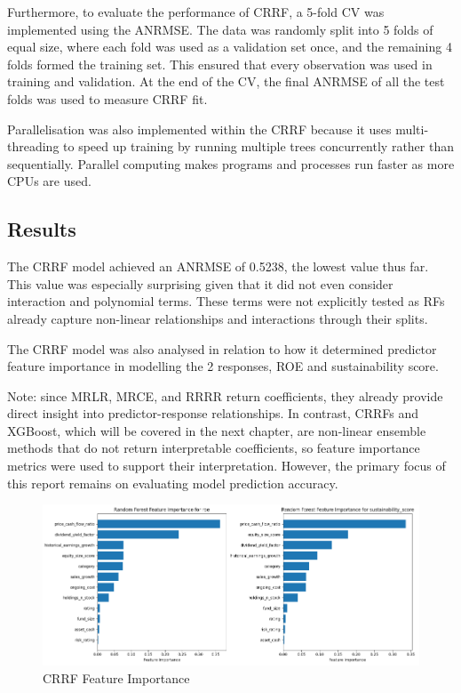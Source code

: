 \documentclass[11pt]{report} %
\begin{document}
Furthermore, to evaluate the performance of CRRF, a 5-fold CV was implemented using the ANRMSE. The data was randomly split into 5 folds of equal size, where each fold was used as a validation set once, and the remaining 4 folds formed the training set. This ensured that every observation was used in training and validation. At the end of the CV, the final ANRMSE of all the test folds was used to measure CRRF fit.

Parallelisation was also implemented within the CRRF because it uses multi-threading to speed up training by running multiple trees concurrently rather than sequentially. Parallel computing makes programs and processes run faster as more CPUs are used.\cite{azizah2019implementation}

\subsection{Results}
\label{C5 Results}
The CRRF model achieved an ANRMSE of 0.5238, the lowest value thus far. This value was especially surprising given that it did not even consider interaction and polynomial terms. These terms were not explicitly tested as RFs already capture non-linear relationships and interactions through their splits. 

The CRRF model was also analysed in relation to how it determined predictor feature importance in modelling the 2 responses, ROE and sustainability score.

\noindent Note: since MRLR, MRCE, and RRRR return coefficients, they already provide direct insight into predictor-response relationships. In contrast, CRRFs and XGBoost, which will be covered in the next chapter, are non-linear ensemble methods that do not return interpretable coefficients, so feature importance metrics were used to support their interpretation. However, the primary focus of this report remains on evaluating model prediction accuracy.

\begin{figure}[H]
    \centering
    \includegraphics[width=\linewidth]{Plots/rffeatureimportance.png}
    \caption{CRRF Feature Importance}
    \label{fig:crrf_feature_importance}
\end{figure}
\end{document}
